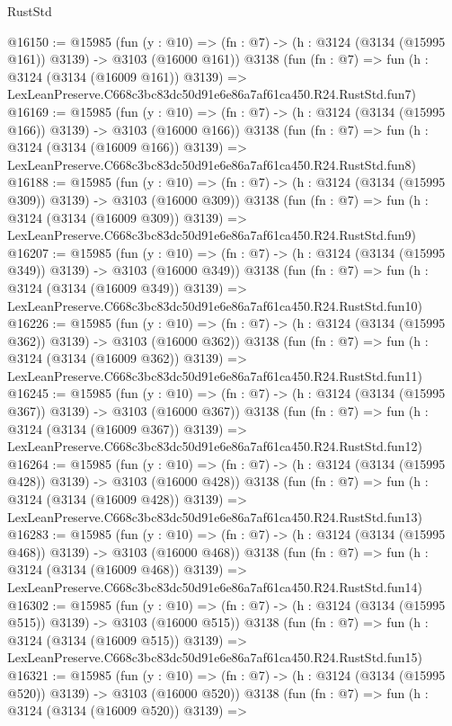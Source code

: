 \begin{lexlean}{RustStd}
\begin{coremodule}
@16150 := @15985
    (fun (y : @10) => (fn : @7) -> (h : @3124 (@3134 (@15995 @161)) @3139) -> @3103 (@16000 @161))
    @3138
    (fun (fn : @7) =>
    fun (h : @3124 (@3134 (@16009 @161)) @3139) =>
    LexLeanPreserve.C668c3bc83dc50d91e6e86a7af61ca450.R24.RustStd.fun7)
@16169 := @15985
    (fun (y : @10) => (fn : @7) -> (h : @3124 (@3134 (@15995 @166)) @3139) -> @3103 (@16000 @166))
    @3138
    (fun (fn : @7) =>
    fun (h : @3124 (@3134 (@16009 @166)) @3139) =>
    LexLeanPreserve.C668c3bc83dc50d91e6e86a7af61ca450.R24.RustStd.fun8)
@16188 := @15985
    (fun (y : @10) => (fn : @7) -> (h : @3124 (@3134 (@15995 @309)) @3139) -> @3103 (@16000 @309))
    @3138
    (fun (fn : @7) =>
    fun (h : @3124 (@3134 (@16009 @309)) @3139) =>
    LexLeanPreserve.C668c3bc83dc50d91e6e86a7af61ca450.R24.RustStd.fun9)
@16207 := @15985
    (fun (y : @10) => (fn : @7) -> (h : @3124 (@3134 (@15995 @349)) @3139) -> @3103 (@16000 @349))
    @3138
    (fun (fn : @7) =>
    fun (h : @3124 (@3134 (@16009 @349)) @3139) =>
    LexLeanPreserve.C668c3bc83dc50d91e6e86a7af61ca450.R24.RustStd.fun10)
@16226 := @15985
    (fun (y : @10) => (fn : @7) -> (h : @3124 (@3134 (@15995 @362)) @3139) -> @3103 (@16000 @362))
    @3138
    (fun (fn : @7) =>
    fun (h : @3124 (@3134 (@16009 @362)) @3139) =>
    LexLeanPreserve.C668c3bc83dc50d91e6e86a7af61ca450.R24.RustStd.fun11)
@16245 := @15985
    (fun (y : @10) => (fn : @7) -> (h : @3124 (@3134 (@15995 @367)) @3139) -> @3103 (@16000 @367))
    @3138
    (fun (fn : @7) =>
    fun (h : @3124 (@3134 (@16009 @367)) @3139) =>
    LexLeanPreserve.C668c3bc83dc50d91e6e86a7af61ca450.R24.RustStd.fun12)
@16264 := @15985
    (fun (y : @10) => (fn : @7) -> (h : @3124 (@3134 (@15995 @428)) @3139) -> @3103 (@16000 @428))
    @3138
    (fun (fn : @7) =>
    fun (h : @3124 (@3134 (@16009 @428)) @3139) =>
    LexLeanPreserve.C668c3bc83dc50d91e6e86a7af61ca450.R24.RustStd.fun13)
@16283 := @15985
    (fun (y : @10) => (fn : @7) -> (h : @3124 (@3134 (@15995 @468)) @3139) -> @3103 (@16000 @468))
    @3138
    (fun (fn : @7) =>
    fun (h : @3124 (@3134 (@16009 @468)) @3139) =>
    LexLeanPreserve.C668c3bc83dc50d91e6e86a7af61ca450.R24.RustStd.fun14)
@16302 := @15985
    (fun (y : @10) => (fn : @7) -> (h : @3124 (@3134 (@15995 @515)) @3139) -> @3103 (@16000 @515))
    @3138
    (fun (fn : @7) =>
    fun (h : @3124 (@3134 (@16009 @515)) @3139) =>
    LexLeanPreserve.C668c3bc83dc50d91e6e86a7af61ca450.R24.RustStd.fun15)
@16321 := @15985
    (fun (y : @10) => (fn : @7) -> (h : @3124 (@3134 (@15995 @520)) @3139) -> @3103 (@16000 @520))
    @3138
    (fun (fn : @7) =>
    fun (h : @3124 (@3134 (@16009 @520)) @3139) =>

\end{coremodule}
\end{lexlean}
